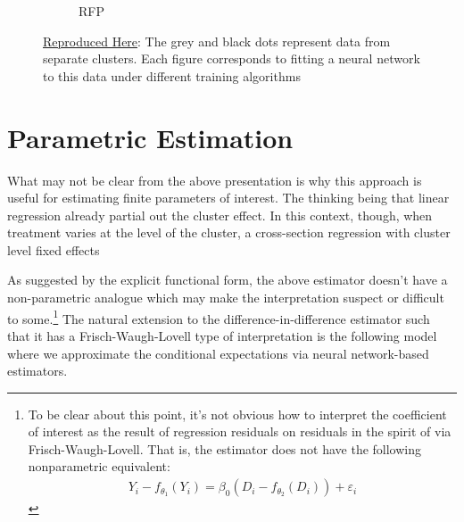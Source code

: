 \documentclass[a4paper,12pt]{article}
\begin{document}
\begin{figure}[htbp]
\begin{subfigure}{.32\textwidth}
        \caption{RFP}
\end{subfigure}
\caption{ \href{https://github.com/pharringtonp19/rfp/blob/main/notebooks/grad_desc_toy.ipynb}{Reproduced Here}: The grey and black dots represent data from separate clusters. Each figure corresponds to fitting a neural network to this data under different training algorithms}
\label{FIGURE LABEL}
\end{figure}
\section{Parametric Estimation}
What may not be clear from the above presentation is why this approach is useful for estimating finite parameters of interest. The thinking being that linear regression already partial out the cluster effect. In this context, though, when treatment varies at the level of the cluster, a cross-section regression with cluster level fixed effects 

As suggested by the explicit functional form, the above estimator doesn't have a non-parametric analogue which may make the interpretation suspect or difficult to some.\footnote{To be clear about this point, it's not obvious how to interpret the coefficient of interest as the result of regression residuals on residuals in the spirit of via Frisch-Waugh-Lovell. That is, the estimator does not have the following nonparametric equivalent: 
\begin{align*}
    Y_i - f_{\theta _1}(Y_i) = \beta_0 (D_i-f_{\theta _2}(D_i)) + \varepsilon_i
\end{align*}}
The natural extension to the difference-in-difference estimator such that it has a Frisch-Waugh-Lovell type of interpretation is the following model where we approximate the conditional expectations via neural network-based estimators.
\end{document}

